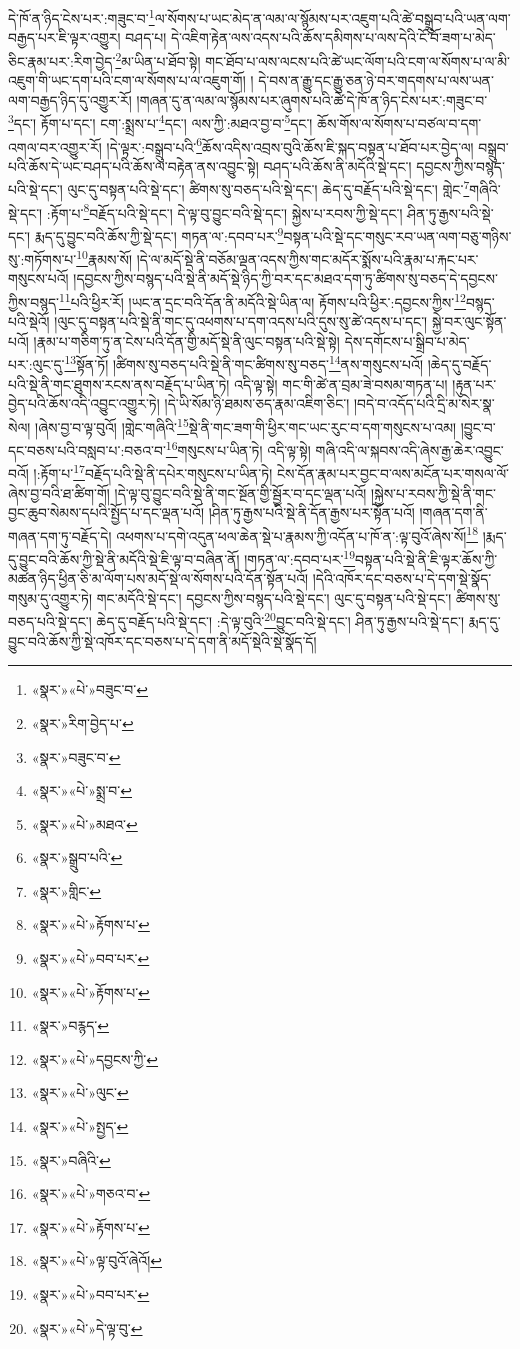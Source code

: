 དེ་ཁོ་ན་ཉིད་ངེས་པར་:གཟུང་བ་\footnote{«སྣར་»«པེ་»བཟུང་བ་}ལ་སོགས་པ་ཡང་མེད་ན་ལམ་ལ་སྙོམས་པར་འཇུག་པའི་ཚེ་བསྒྲུབ་པའི་ཡན་ལག་བརྒྱད་པར་ཇི་ལྟར་འགྱུར། བཤད་པ། དེ་འཇིག་རྟེན་ལས་འདས་པའི་ཆོས་དམིགས་པ་ལས་དེའི་ངོ་བོ་ཟག་པ་མེད་ཅིང་རྣམ་པར་:རིག་བྱེད་\footnote{«སྣར་»རིག་བྱེད་པ་}མ་ཡིན་པ་ཐོབ་སྟེ། གང་ཐོབ་པ་ལས་ལངས་པའི་ཚེ་ཡང་ལོག་པའི་ངག་ལ་སོགས་པ་ལ་མི་འཇུག་གི་ཡང་དག་པའི་ངག་ལ་སོགས་པ་ལ་འཇུག་གོ། །
དེ་བས་ན་རྒྱུ་དང་རྒྱུ་ཅན་ཉེ་བར་གདགས་པ་ལས་ཡན་ལག་བརྒྱད་ཉིད་དུ་འགྱུར་རོ། །གཞན་དུ་ན་ལམ་ལ་སྙོམས་པར་ཞུགས་པའི་ཚེ་དེ་ཁོ་ན་ཉིད་ངེས་པར་:གཟུང་བ་\footnote{«སྣར་»བཟུང་བ་}དང་། རྟོག་པ་དང་། ངག་:སྨྲས་པ་\footnote{«སྣར་»«པེ་»སྨྲ་བ་}དང་། ལས་ཀྱི་:མཐའ་བྱ་བ་\footnote{«སྣར་»«པེ་»མཐའ་}དང་། ཆོས་གོས་ལ་སོགས་པ་བཙལ་བ་དག་འགལ་བར་འགྱུར་རོ། །དེ་ལྟར་:བསྒྲུབ་པའི་\footnote{«སྣར་»སྒྲུབ་པའི་}ཆོས་འདིས་འབྲས་བུའི་ཆོས་ཇི་སྐད་བསྟན་པ་ཐོབ་པར་བྱེད་ལ། བསྒྲུབ་པའི་ཆོས་དེ་ཡང་བཤད་པའི་ཆོས་ལ་བརྟེན་ནས་འབྱུང་སྟེ། བཤད་པའི་ཆོས་ནི་མདོའི་སྡེ་དང་། དབྱངས་ཀྱིས་བསྙད་པའི་སྡེ་དང་། ལུང་དུ་བསྟན་པའི་སྡེ་དང་། ཚིགས་སུ་བཅད་པའི་སྡེ་དང་། ཆེད་དུ་བརྗོད་པའི་སྡེ་དང་། གླེང་\footnote{«སྣར་»གླིང་}གཞིའི་སྡེ་དང་། :རྟོག་པ་\footnote{«སྣར་»«པེ་»རྟོགས་པ་}བརྗོད་པའི་སྡེ་དང་། དེ་ལྟ་བུ་བྱུང་བའི་སྡེ་དང་། སྐྱེས་པ་རབས་ཀྱི་སྡེ་དང་། ཤིན་ཏུ་རྒྱས་པའི་སྡེ་དང་། རྨད་དུ་བྱུང་བའི་ཆོས་ཀྱི་སྡེ་དང་། གཏན་ལ་:དབབ་པར་\footnote{«སྣར་»«པེ་»བབ་པར་}བསྟན་པའི་སྡེ་དང་གསུང་རབ་ཡན་ལག་བཅུ་གཉིས་སུ་:གཏོགས་པ་\footnote{«སྣར་»«པེ་»རྟོགས་པ་}རྣམས་སོ། །དེ་ལ་མདོ་སྡེ་ནི་བཅོམ་ལྡན་འདས་ཀྱིས་གང་མདོར་སྨོས་པའི་རྣམ་པ་རྐང་པར་གསུངས་པའོ། །དབྱངས་ཀྱིས་བསྙད་པའི་སྡེ་ནི་མདོ་སྡེ་ཉིད་ཀྱི་བར་དང་མཐའ་དག་ཏུ་ཚིགས་སུ་བཅད་དེ་དབྱངས་ཀྱིས་བསྙད་\footnote{«སྣར་»བརྙད་}པའི་ཕྱིར་རོ། །ཡང་ན་དྲང་བའི་དོན་ནི་མདོའི་སྡེ་ཡིན་ལ། རྟོགས་པའི་ཕྱིར་:དབྱངས་ཀྱིས་\footnote{«སྣར་»«པེ་»དབྱངས་ཀྱི་}བསྙད་པའི་སྡེའོ། །ལུང་དུ་བསྟན་པའི་སྡེ་ནི་གང་དུ་འཕགས་པ་དག་འདས་པའི་དུས་སུ་ཚེ་འདས་པ་དང་། སྐྱེ་བར་ལུང་སྟོན་པའོ། །རྣམ་པ་གཅིག་ཏུ་ན་ངེས་པའི་དོན་གྱི་མདོ་སྡེ་ནི་ལུང་བསྟན་པའི་སྡེ་སྟེ། དེས་དགོངས་པ་སྒྲིབ་པ་མེད་པར་:ལུང་དུ་\footnote{«སྣར་»«པེ་»ལུང་}སྟོན་ཏོ། །ཚིགས་སུ་བཅད་པའི་སྡེ་ནི་གང་ཚིགས་སུ་བཅད་\footnote{«སྣར་»«པེ་»སྤྱད་}ནས་གསུངས་པའོ། །ཆེད་དུ་བརྗོད་པའི་སྡེ་ནི་གང་ཐུགས་རངས་ནས་བརྗོད་པ་ཡིན་ཏེ། འདི་ལྟ་སྟེ། གང་གི་ཚེ་ན་བྲམ་ཟེ་བསམ་གཏན་པ། །རྟུན་པར་བྱེད་པའི་ཆོས་འདི་འབྱུང་འགྱུར་ཏེ། །དེ་ཡི་སོམ་ཉི་ཐམས་ཅད་རྣམ་འཇིག་ཅིང་། །བདེ་བ་འདོད་པའི་དྲི་མ་སེར་སྣ་སེལ། །ཞེས་བྱ་བ་ལྟ་བུའོ། །གླེང་གཞིའི་\footnote{«སྣར་»བཞིའི་}སྡེ་ནི་གང་ཟག་གི་ཕྱིར་གང་ཡང་རུང་བ་དག་གསུངས་པ་འམ། །བྱུང་བ་དང་བཅས་པའི་བསླབ་པ་:བཅའ་བ་\footnote{«སྣར་»«པེ་»གཅའ་བ་}གསུངས་པ་ཡིན་ཏེ། འདི་ལྟ་སྟེ། གཞི་འདི་ལ་སྐབས་འདི་ཞེས་རྒྱ་ཆེར་འབྱུང་བའོ། །:རྟོག་པ་\footnote{«སྣར་»«པེ་»རྟོགས་པ་}བརྗོད་པའི་སྡེ་ནི་དཔེར་གསུངས་པ་ཡིན་ཏེ། ངེས་དོན་རྣམ་པར་བྱང་བ་ལས་མངོན་པར་གསལ་ལོ་ཞེས་བྱ་བའི་ཐ་ཚིག་གོ། །དེ་ལྟ་བུ་བྱུང་བའི་སྡེ་ནི་གང་སྔོན་གྱི་སྦྱོར་བ་དང་ལྡན་པའོ། །སྐྱེས་པ་རབས་ཀྱི་སྡེ་ནི་གང་བྱང་ཆུབ་སེམས་དཔའི་སྤྱོད་པ་དང་ལྡན་པའོ། །ཤིན་ཏུ་རྒྱས་པའི་སྡེ་ནི་དོན་རྒྱས་པར་སྟོན་པའོ། །གཞན་དག་ནི་གཞན་དག་ཏུ་བརྗོད་དེ། འཕགས་པ་དགེ་འདུན་ཕལ་ཆེན་སྡེ་པ་རྣམས་ཀྱི་འདོན་པ་ཁོ་ན་:ལྟ་བུའོ་ཞེས་སོ།\footnote{«སྣར་»«པེ་»ལྟ་བུའོ་ཞེའོ།} །རྨད་དུ་བྱུང་བའི་ཆོས་ཀྱི་སྡེ་ནི་མདོའི་སྡེ་ཇི་ལྟ་བ་བཞིན་ནོ། །གཏན་ལ་:དབབ་པར་\footnote{«སྣར་»«པེ་»བབ་པར་}བསྟན་པའི་སྡེ་ནི་ཇི་ལྟར་ཆོས་ཀྱི་མཚན་ཉིད་ཕྱིན་ཅི་མ་ལོག་པས་མདོ་སྡེ་ལ་སོགས་པའི་དོན་སྟོན་པའོ། །དེའི་འཁོར་དང་བཅས་པ་དེ་དག་སྡེ་སྣོད་གསུམ་དུ་འགྱུར་ཏེ། གང་མདོའི་སྡེ་དང་། དབྱངས་ཀྱིས་བསྙད་པའི་སྡེ་དང་། ལུང་དུ་བསྟན་པའི་སྡེ་དང་། ཚིགས་སུ་བཅད་པའི་སྡེ་དང་། ཆེད་དུ་བརྗོད་པའི་སྡེ་དང་། :དེ་ལྟ་བུའི་\footnote{«སྣར་»«པེ་»དེ་ལྟ་བུ་}བྱུང་བའི་སྡེ་དང་། ཤིན་ཏུ་རྒྱས་པའི་སྡེ་དང་། རྨད་དུ་བྱུང་བའི་ཆོས་ཀྱི་སྡེ་འཁོར་དང་བཅས་པ་དེ་དག་ནི་མདོ་སྡེའི་སྡེ་སྣོད་དོ། 